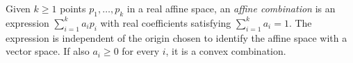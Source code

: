 
Given $k\ge1$ points $p_1,\ldots,p_k$ in a real affine space, an \emph{affine combination} is an expression $\sum_{i=1}^{k}a_ip_i$ with real coefficients satisfying $\sum_{i=1}^k a_i=1$. The expression is independent of the origin chosen to identify the affine space with a vector space. If also $a_i\ge0$ for every $i$, it is a convex combination.
